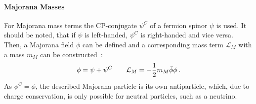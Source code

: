 \paragraph{Majorana Masses}
For Majorana mass terms the CP-conjugate $\psi^C$ of a fermion spinor $\psi$ is used. It should be noted, that if $\psi$ is left-handed, $\psi^C$ is right-handed and vice versa. Then, a Majorana field $\phi$ can be defined and a corresponding mass term $\mathcal{L}_M$ with a mass $m_M$ can be constructed~\cite{zuber2011neutrino}:
\begin{equation}
\phi = \psi + \psi^C \qquad \mathcal{L}_M = -\frac{1}{2}m_M \bar\phi \phi \text{\,.}
\end{equation}
As $\phi^C=\phi$, the described Majorana particle is its own antiparticle, which, due to charge conservation, is only possible for neutral particles, such as a neutrino.

